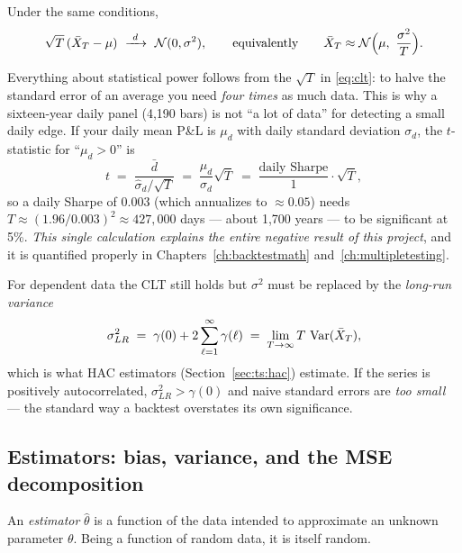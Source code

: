 \begin{theorem}
Under the same conditions,
\begin{equation}
  \sqrt{T}\,(\bar X_T-\mu)\ \xrightarrow{\ d\ }\ \mathcal N(0,\sigma^2),
  \qquad\text{equivalently}\qquad
  \bar X_T \approx \mathcal N\Bigl(\mu,\ \frac{\sigma^2}{T}\Bigr).
  \label{eq:clt}
\end{equation}
\end{theorem}

Everything about statistical power follows from the $\sqrt T$ in \eqref{eq:clt}: to halve
the standard error of an average you need \emph{four times} as much data. This is why a
sixteen-year daily panel (4{,}190 bars) is not ``a lot of data'' for detecting a small
daily edge. If your daily mean P\&L is $\mu_d$ with daily standard deviation
$\sigma_d$, the $t$-statistic for ``$\mu_d>0$'' is
\begin{equation}
  t \;=\; \frac{\bar d}{\hat\sigma_d/\sqrt{T}}
  \;=\; \frac{\mu_d}{\sigma_d}\sqrt{T}
  \;=\; \frac{\text{daily Sharpe}}{1}\cdot\sqrt{T},
  \label{eq:sharpetstat}
\end{equation}
so a daily Sharpe of $0.003$ (which annualizes to $\approx0.05$) needs
$T\approx(1.96/0.003)^2\approx 427{,}000$ days --- about 1{,}700 years --- to be
significant at 5\%. \emph{This single calculation explains the entire negative result of
this project}, and it is quantified properly in Chapters~\ref{ch:backtestmath}
and~\ref{ch:multipletesting}.

For dependent data the CLT still holds but $\sigma^2$ must be replaced by the
\emph{long-run variance}
\begin{equation}
  \sigma^2_{LR} \;=\; \gamma(0) + 2\sum_{\ell=1}^{\infty}\gamma(\ell)
  \;=\; \lim_{T\to\infty} T\,\operatorname{Var}(\bar X_T),
  \label{eq:longrunvar}
\end{equation}
which is what HAC estimators (Section~\ref{sec:ts:hac}) estimate. If the series is
positively autocorrelated, $\sigma^2_{LR}>\gamma(0)$ and naive standard errors are
\emph{too small} --- the standard way a backtest overstates its own significance.

\subsection{Estimators: bias, variance, and the MSE decomposition}
\label{sec:prob:estimators}

An \emph{estimator} $\hat\theta$ is a function of the data intended to approximate an
unknown parameter $\theta$. Being a function of random data, it is itself random.

